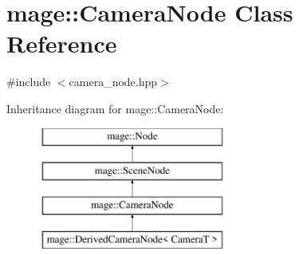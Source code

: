 \hypertarget{classmage_1_1_camera_node}{}\section{mage\+:\+:Camera\+Node Class Reference}
\label{classmage_1_1_camera_node}


{\ttfamily \#include $<$camera\+\_\+node.\+hpp$>$}

Inheritance diagram for mage\+:\+:Camera\+Node\+:\begin{figure}[H]
\begin{center}
\leavevmode
\includegraphics[height=4.000000cm]{classmage_1_1_camera_node}
\end{center}
\end{figure}
